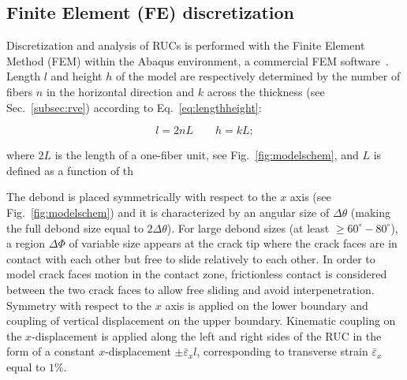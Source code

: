 \documentclass[smallextended]{svjour3}       %
\begin{document}
\subsection{Finite Element (FE) discretization}

Discretization and analysis of RUCs is performed with the Finite Element Method (FEM) within the Abaqus environment, a commercial FEM software~\cite{abq12}. Length $l$ and height $h$ of the model are respectively determined by the number of fibers $n$ in the horizontal direction and $k$ across the thickness (see Sec.~\ref{subsec:rve}) according to Eq.~\ref{eq:lengthheight}:

\begin{equation}\label{eq:lengthheight}
l=2nL\qquad h=kL;
\end{equation}

where $2L$ is the length of a one-fiber unit, see Fig.~\ref{fig:modelschem}, and $L$ is defined as a function of th



The debond is placed symmetrically with respect to the $x$ axis (see Fig.~\ref{fig:modelschem}) and it is characterized by an angular size of $\Delta\theta$ (making the full debond size equal to $2\Delta\theta$). For large debond sizes (at least $\geq 60^{\circ}-80^{\circ}$), a region $\Delta\Phi$ of variable size appears at the crack tip where the crack faces are in contact with each other but free to slide relatively to each other. In order to model crack faces motion in the contact zone, frictionless contact is considered between the two crack faces to allow free sliding and avoid interpenetration. Symmetry with respect to the $x$ axis is applied on the lower boundary and coupling of vertical displacement on the upper boundary. Kinematic coupling on the $x$-displacement is applied along the left and right sides of the RUC in the form of a constant $x$-displacement $\pm\bar{\varepsilon}_{x} l$, corresponding to transverse strain $\bar{\varepsilon}_{x}$ equal to $1\%$.
\end{document}
